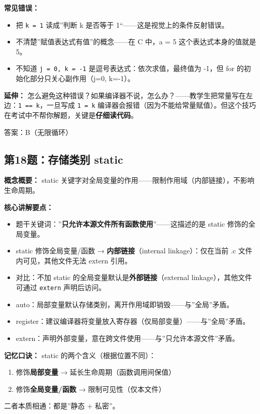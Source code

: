 \textbf{常见错误：}
\begin{itemize}
    \item 把 \texttt{k = 1} 读成”判断 k 是否等于 1“——这是视觉上的条件反射错误。
    \item 不清楚”赋值表达式有值”的概念——在 C 中，a = 5 这个表达式本身的值就是 5。
    \item 不知道 \texttt{j = 0, k = -1} 是逗号表达式：依次求值，最终值为 -1，但 for 的初始化部分只关心副作用（j=0, k=-1）。
\end{itemize}

\textbf{延伸：} 怎么避免这种错误？如果编译器不说，怎么办？——教学生把常量写在左边：\texttt{1 == k}，一旦写成 \texttt{1 = k} 编译器会报错（因为不能给常量赋值）。但这个技巧在考试中不帮你解题，关键是\textbf{仔细读代码}。

{\color{highlight}答案：B（无限循环）}

\subsection{第18题：存储类别 static}

\textbf{概念概要：} static 关键字对全局变量的作用——限制作用域（内部链接），不影响生命周期。

\textbf{核心讲解要点：}
\begin{itemize}
    \item 题干关键词：”\textbf{只允许本源文件所有函数使用}”——这描述的是 static 修饰的全局变量。
    \item static 修饰全局变量/函数 → \textbf{内部链接}（internal linkage）：仅在当前 .c 文件内可见，其他文件无法 extern 引用。
    \item 对比：不加 static 的全局变量默认是\textbf{外部链接}（external linkage），其他文件可通过 \texttt{extern} 声明后访问。
    \item auto：局部变量默认存储类别，离开作用域即销毁——与”全局”矛盾。
    \item register：建议编译器将变量放入寄存器（仅局部变量）——与”全局”矛盾。
    \item extern：声明外部变量，意在跨文件使用——与”只允许本源文件”矛盾。
\end{itemize}

\textbf{记忆口诀：} static 的两个含义（根据位置不同）：
\begin{enumerate}
    \item 修饰\textbf{局部变量} → 延长生命周期（函数调用间保值）
    \item 修饰\textbf{全局变量/函数} → 限制可见性（仅本文件）
\end{enumerate}
二者本质相通：都是”静态 + 私密”。

